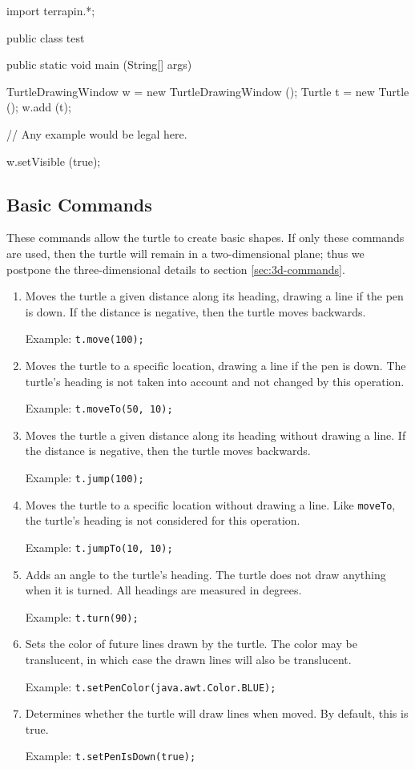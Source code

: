 \documentclass{article}
\newenvironment{commandtable}
  {\begin{enumerate}}
  {\end{enumerate}}
\def\command[#1]{\item[\tt #1]}
\def\example[#1]{\par Example: {\tt #1}}
\begin{document}
    \lstset{gobble=6}
    \begin{java}
      import terrapin.*;

      public class test {
	public static void main (String[] args) {
	  TurtleDrawingWindow w = new TurtleDrawingWindow ();
	  Turtle t = new Turtle ();
	  w.add (t);
	  
	  // Any example would be legal here.

	  w.setVisible (true);
	}
      }
    \end{java}

    \subsection{Basic Commands}
      \label{sec:basic-commands}

      These commands allow the turtle to create basic shapes. If only these
      commands are used, then the turtle will remain in a two-dimensional plane;
      thus we postpone the three-dimensional details to section
      \ref{sec:3d-commands}.

      \begin{commandtable}
	\command[move]
	Moves the turtle a given distance along its heading, drawing a line if
	the pen is down. If the distance is negative, then the turtle moves
	backwards.
	\example[t.move(100);]

	\command[moveTo]
	Moves the turtle to a specific location, drawing a line if the pen is
	down. The turtle's heading is not taken into account and not changed by
	this operation.
	\example[t.moveTo(50, 10);]

	\command[jump]
	Moves the turtle a given distance along its heading without drawing a
	line. If the distance is negative, then the turtle moves backwards.
	\example[t.jump(100);]

	\command[jumpTo]
	Moves the turtle to a specific location without drawing a line. Like
	{\tt moveTo}, the turtle's heading is not considered for this operation.
	\example[t.jumpTo(10, 10);]

	\command[turn]
	Adds an angle to the turtle's heading. The turtle does not draw anything
	when it is turned. All headings are measured in degrees.
	\example[t.turn(90);]

	\command[setPenColor]
	Sets the color of future lines drawn by the turtle. The color may be
	translucent, in which case the drawn lines will also be translucent.
	\example[t.setPenColor(java.awt.Color.BLUE);]

	\command[setPenIsDown]
	Determines whether the turtle will draw lines when moved. By default,
	this is true.
	\example[t.setPenIsDown(true);]
      \end{commandtable}
\end{document}
